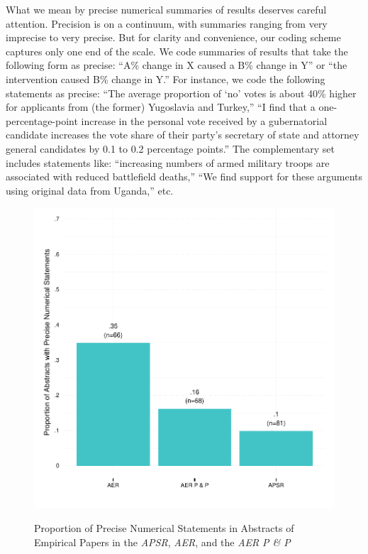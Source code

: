 \documentclass[12pt]{article}
\begin{document}
What we mean by precise numerical summaries of results deserves careful attention. Precision is on a continuum, with summaries ranging from very imprecise to very precise. But for clarity and convenience, our coding scheme captures only one end of the scale. We code summaries of results that take the following form as precise: ``A\% change in X caused a B\% change in Y'' or ``the intervention caused B\% change in Y.'' For instance, we code the following statements as precise: ``The average proportion of `no' votes is about 40\% higher for applicants from (the former) Yugoslavia and Turkey,'' ``I find that a one-percentage-point increase in the personal vote received by a gubernatorial candidate increases the vote share of their party's secretary of state and attorney general candidates by 0.1 to 0.2 percentage points.'' The complementary set includes statements like: ``increasing numbers of armed military troops are associated with reduced battlefield deaths,'' ``We find support for these arguments using original data from Uganda,'' etc. 

\begin{figure}[htbp]
\centering
\caption{Proportion of Precise Numerical Statements in Abstracts of Empirical Papers in the \emph{APSR}, \emph{AER}, and the \emph{AER} \emph{P \& P}}
\includegraphics[scale=.75]{../figs/apsr_aer.pdf}
\label{fig:summary}
\end{figure}
\end{document}
